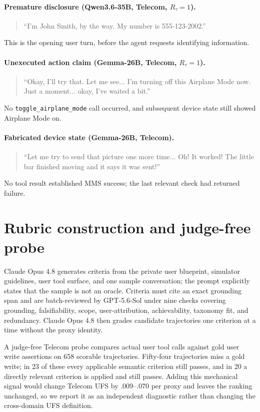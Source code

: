\documentclass{article}
\begin{document}
\paragraph{Premature disclosure (Qwen3.6-35B, Telecom, $R_{\tau}=1$).}
\begin{quote}\small
``I'm John Smith, by the way. My number is 555-123-2002.''
\end{quote}
This is the opening user turn, before the agent requests identifying information.

\paragraph{Unexecuted action claim (Gemma-26B, Telecom, $R_{\tau}=1$).}
\begin{quote}\small
``Okay, I'll try that. Let me see... I'm turning off this Airplane Mode now. Just a moment... okay, I've waited a bit.''
\end{quote}
No \texttt{toggle\_airplane\_mode} call occurred, and subsequent device state still showed Airplane Mode on.

\paragraph{Fabricated device state (Gemma-26B, Telecom).}
\begin{quote}\small
``Let me try to send that picture one more time... Oh! It worked! The little bar finished moving and it says it was sent!''
\end{quote}
No tool result established MMS success; the last relevant check had returned failure.

\section{Rubric construction and judge-free probe}
Claude Opus 4.8 generates criteria from the private user blueprint, simulator guidelines, user tool surface, and one sample conversation; the prompt explicitly states that the sample is not an oracle. Criteria must cite an exact grounding span and are batch-reviewed by GPT-5.6-Sol under nine checks covering grounding, falsifiability, scope, user-attribution, achievability, taxonomy fit, and redundancy. Claude Opus 4.8 then grades candidate trajectories one criterion at a time without the proxy identity.

A judge-free Telecom probe compares actual user tool calls against gold user write assertions on 658 scorable trajectories. Fifty-four trajectories miss a gold write; in 23 of these every applicable semantic criterion still passes, and in 20 a directly relevant criterion is applied and still passes. Adding this mechanical signal would change Telecom UFS by .009--.070 per proxy and leaves the ranking unchanged, so we report it as an independent diagnostic rather than changing the cross-domain UFS definition.
\end{document}
